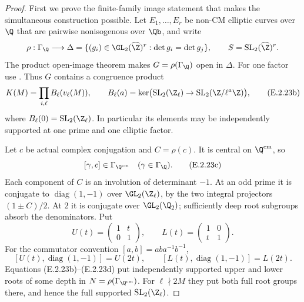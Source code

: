 \begin{proof}
First we prove the finite-family image statement that makes
the simultaneous construction possible. Let
\(E_1,\ldots,E_r\) be non-CM elliptic curves over \(\Q\)
that are pairwise nonisogenous over \(\Qb\), and write
\[
 \rho:\Gamma_{\Q}\longrightarrow
 \Delta=\{(g_i)\in\GL_2(\widehat\Z)^r:
                  \det g_i=\det g_j\},\qquad
 S=\operatorname{SL}_2(\widehat\Z)^r.
\]
The product open-image theorem
\cite[Theorem 1.1 and Remark 1.2, author PDF p.1]{GenLombardo}
makes \(G=\rho(\Gamma_{\Q})\) open in \(\Delta\).
For one factor use \cite[Theorem 3, p.299]{GenSerre1972}.
Thus \(G\) contains a congruence product
\[
 K(M)=\prod_{i,\ell}B_\ell(v_\ell(M)),\qquad
 B_\ell(a)=\ker\bigl(\operatorname{SL}_2(\Z_\ell)
                 \to\operatorname{SL}_2(\Z/\ell^a\Z)\bigr),
 \tag{E.2.23b}
\]
where \(B_\ell(0)=\operatorname{SL}_2(\Z_\ell)\).
In particular its elements may be independently supported
at one prime and one elliptic factor.

Let \(c\) be actual complex conjugation and \(C=\rho(c)\).
It is central on \(\Q^{\mathrm{cm}}\), so
\[
 [\gamma,c]\in\Gamma_{\Q^{\mathrm{cm}}}
       \quad(\gamma\in\Gamma_\Q).
 \tag{E.2.23c}
\]
Each component of \(C\) is an involution of determinant
\(-1\). At an odd prime it is conjugate to
\(\operatorname{diag}(1,-1)\) over \(\GL_2(\Z_\ell)\),
by the two integral projectors \((1\pm C)/2\).
At \(2\) it is conjugate over \(\GL_2(\Q_2)\);
sufficiently deep root subgroups absorb the denominators.
Put
\[
 U(t)=\begin{pmatrix}1&t\\0&1\end{pmatrix},\qquad
 L(t)=\begin{pmatrix}1&0\\t&1\end{pmatrix}.
\]
For the commutator convention \([a,b]=aba^{-1}b^{-1}\),
\[
 [U(t),\operatorname{diag}(1,-1)]=U(2t),\qquad
 [L(t),\operatorname{diag}(1,-1)]=L(2t).
 \tag{E.2.23d}
\]
Equations (E.2.23b)--(E.2.23d) put independently supported
upper and lower roots of some depth in
\(N=\rho(\Gamma_{\Q^{\mathrm{cm}}})\).
For \(\ell\nmid2M\) they put both full root groups there,
and hence the full supported \(\operatorname{SL}_2(\Z_\ell)\).


\end{proof}
